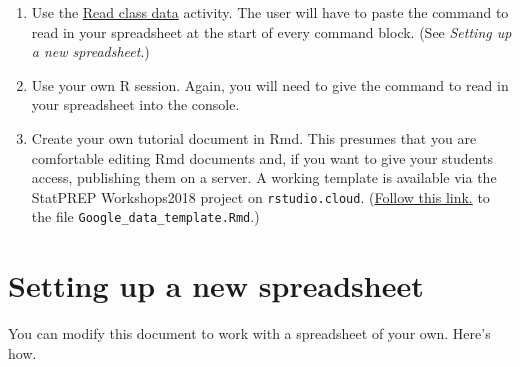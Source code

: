 \documentclass[]{book}
\providecommand{\tightlist}{%
  \setlength{\itemsep}{0pt}\setlength{\parskip}{0pt}}
\theoremstyle{definition}
\theoremstyle{definition}
\theoremstyle{definition}
\theoremstyle{remark}
\begin{document}
\begin{enumerate}
\def\labelenumi{\arabic{enumi}.}
\tightlist
\item
  Use the
  \href{http://dtkaplan.shinyapps.io/Lesson_read_class_data.png}{Read
  class data} activity. The user will have to paste the command to read
  in your spreadsheet at the start of every command block. (See
  \emph{Setting up a new spreadsheet}.)
\item
  Use your own R session. Again, you will need to give the command to
  read in your spreadsheet into the console.
\item
  Create your own tutorial document in Rmd. This presumes that you are
  comfortable editing Rmd documents and, if you want to give your
  students access, publishing them on a server. A working template is
  available via the StatPREP Workshops2018 project on
  \texttt{rstudio.cloud}.
  (\href{https://rstudio.cloud/project/38547}{Follow this link.} to the
  file \texttt{Google\_data\_template.Rmd}.)
\end{enumerate}

\section{Setting up a new
spreadsheet}\label{setting-up-a-new-spreadsheet}

You can modify this document to work with a spreadsheet of your own.
Here's how.
\end{document}
